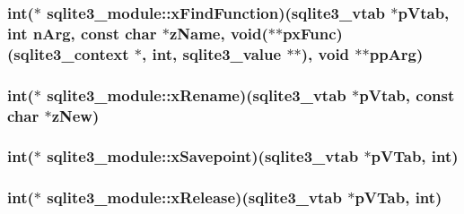 \hypertarget{structsqlite3__module_e70a020a7dda960b91943e9f67695dbb}{
\subsubsection[xFindFunction]{\setlength{\rightskip}{0pt plus 5cm}int($\ast$ {\bf sqlite3\_\-module::xFindFunction})({\bf sqlite3\_\-vtab} $\ast$pVtab, int nArg, const char $\ast$zName, void($\ast$$\ast$pxFunc)({\bf sqlite3\_\-context} $\ast$, int, {\bf sqlite3\_\-value} $\ast$$\ast$), void $\ast$$\ast$ppArg)}}
\label{structsqlite3__module_e70a020a7dda960b91943e9f67695dbb}


\hypertarget{structsqlite3__module_f886782e9a1ea5c4b131b2bc373c8092}{
\subsubsection[xRename]{\setlength{\rightskip}{0pt plus 5cm}int($\ast$ {\bf sqlite3\_\-module::xRename})({\bf sqlite3\_\-vtab} $\ast$pVtab, const char $\ast$zNew)}}
\label{structsqlite3__module_f886782e9a1ea5c4b131b2bc373c8092}


\hypertarget{structsqlite3__module_f90f1df803fce1b90048864aeeeee890}{
\subsubsection[xSavepoint]{\setlength{\rightskip}{0pt plus 5cm}int($\ast$ {\bf sqlite3\_\-module::xSavepoint})({\bf sqlite3\_\-vtab} $\ast$pVTab, int)}}
\label{structsqlite3__module_f90f1df803fce1b90048864aeeeee890}


\hypertarget{structsqlite3__module_8dcaa6dc6d9563c8da57e4c8c5055609}{
\subsubsection[xRelease]{\setlength{\rightskip}{0pt plus 5cm}int($\ast$ {\bf sqlite3\_\-module::xRelease})({\bf sqlite3\_\-vtab} $\ast$pVTab, int)}}
\label{structsqlite3__module_8dcaa6dc6d9563c8da57e4c8c5055609}


